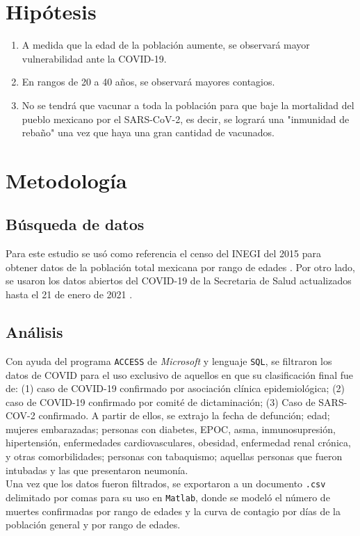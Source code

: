 \documentclass[12pt,a4paper]{article}
\begin{document}
\section{Hipótesis}
\begin{enumerate}
  \item A medida que la edad de la población aumente, se observará mayor vulnerabilidad ante la COVID-19.
  \item En rangos de 20 a 40 años, se observará mayores contagios.
  \item No se tendrá que vacunar a toda la población para que baje la mortalidad del pueblo mexicano por el SARS-CoV-2, es decir, se logrará una "inmunidad de rebaño" una vez que haya una gran cantidad de vacunados.
\end{enumerate} 




\section{Metodología}
\subsection{Búsqueda de datos}
\setlength{\parindent}{0cm}
Para este estudio se usó como referencia el censo del INEGI del 2015 para obtener datos de la población total mexicana por rango de edades \citep{INEGI}. Por otro lado, se usaron los datos abiertos del COVID-19 de la Secretaria de Salud actualizados hasta el 21 de enero de 2021 \citep{ss}.
\setlength{\parindent}{1cm}

\subsection{Análisis}
\setlength{\parindent}{0cm}
Con ayuda del programa \texttt{ACCESS} de \textit{Microsoft} y lenguaje \texttt{SQL}, se filtraron los datos de COVID para el uso exclusivo de aquellos en que su clasificación final fue de: (1) caso de COVID-19 confirmado por asociación clínica epidemiológica; (2) caso de COVID-19 confirmado por comité de dictaminación; (3) Caso de SARS-COV-2 confirmado. A partir de ellos, se extrajo la fecha de defunción; edad; mujeres embarazadas; personas con diabetes, EPOC, asma, inmunosupresión, hipertensión, enfermedades cardiovasculares, obesidad, enfermedad renal crónica, y otras comorbilidades; personas con tabaquismo; aquellas personas que fueron intubadas y las que presentaron neumonía.  
\\ 
Una vez que los datos fueron filtrados, se exportaron a un documento \texttt{.csv} delimitado por comas para su uso en \texttt{Matlab}, donde se modeló el número de muertes confirmadas por rango de edades y la curva de contagio por días de la población general y por rango de edades. 
\setlength{\parindent}{1cm}
\end{document}
